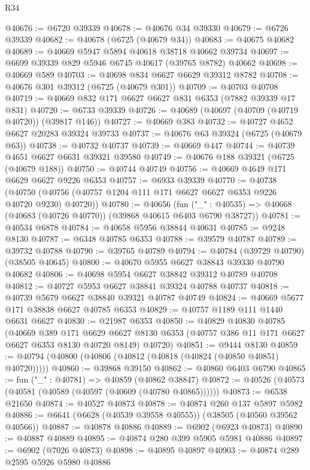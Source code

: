 \begin{lexlean}{R34}
\begin{coremodule}
@40676 := @6720 @39339
@40678 := @40676 @34 @39330
@40679 := @6726 @39339
@40682 := @40678 (@6725 (@40679 @34))
@40683 := @40675 @40682
@40689 := @40669 @5947 @5894 @40618 @38718 @40662 @39734
@40697 := @6699 @39339 @829 @5946 @6745 @40617 (@39765 @8782) @40662
@40698 := @40669 @589
@40703 := @40698 @834 @6627 @6629 @39312 @8782
@40708 := @40676 @301 @39312 (@6725 (@40679 @301))
@40709 := @40703 @40708
@40719 := @40669 @832 @171 @6627 @6627 @831 @6353 (@7882 @39339 @17 @831)
@40720 := @6733 @39339
@40726 := @40689 (@40697 (@40709 (@40719 @40720)) (@39817 @146))
@40727 := @40669 @383
@40732 := @40727 @4652 @6627 @20283 @39324 @39733
@40737 := @40676 @63 @39324 (@6725 (@40679 @63))
@40738 := @40732 @40737
@40739 := @40669 @447
@40744 := @40739 @4651 @6627 @6631 @39321 @39580
@40749 := @40676 @188 @39321 (@6725 (@40679 @188))
@40750 := @40744 @40749
@40756 := @40669 @4649 @171 @6629 @6627 @9226 @6353
@40757 := @6933 @39339
@40770 := @40738
    (@40750 (@40756 (@40757 @1204 @111 @171 @6627 @6627 @6353 @9226 @40720 @9230) @40720))
@40780 := @40656
    (fun ("_" : @40535) => @40668 (@40683 (@40726 @40770)) (@39868 @40615 @6403 @6790 @38727))
@40781 := @40534 @6878
@40784 := @40658 @5956 @38844 @40631
@40785 := @9248 @8130
@40787 := @6348 @40785 @6353
@40788 := @39579 @40787
@40789 := @39732 @40788
@40790 := @39765 @40789
@40794 := @40784 (@39729 @40790) (@38505 @40645)
@40800 := @40670 @5955 @6627 @38843 @39330 @40790 @40682
@40806 := @40698 @5954 @6627 @38842 @39312 @40789 @40708
@40812 := @40727 @5953 @6627 @38841 @39324 @40788 @40737
@40818 := @40739 @5679 @6627 @38840 @39321 @40787 @40749
@40824 := @40669 @5677 @171 @38838 @6627 @40785 @6353
@40829 := @40757 @1189 @111 @1440 @6631 @6627
@40830 := @21987 @6353
@40850 := @40829
    @40830
    @40785
    (@40669
      @389
      @171
      @6629
      @6627
      @8130
      @6353
      (@40757 @386 @11 @171 @6627 @6627 @6353 @8130 @40720 @8149)
      @40720)
@40851 := @9444 @8130
@40859 := @40794 (@40800 (@40806 (@40812 (@40818 (@40824 (@40850 @40851) @40720)))))
@40860 := @39868 @39150
@40862 := @40860 @6403 @6790
@40865 := fun ("_" : @40781) => @40859 (@40862 @38847)
@40872 := @40526 (@40573 (@40581 (@40589 (@40597 (@40609 (@40780 @40865))))))
@40873 := @6538 @21650
@40874 := @40527 @40873
@40878 := @40874 @260 @137 @5897 @5982
@40886 := @6641 (@6628 (@40539 @39558 @40555)) (@38505 (@40560 @39562 @40566))
@40887 := @40878 @40886
@40889 := @6902 (@6923 @40873)
@40890 := @40887 @40889
@40895 := @40874 @280 @399 @5905 @5981 @40886
@40897 := @6902 (@7026 @40873)
@40898 := @40895 @40897
@40903 := @40874 @289 @2595 @5926 @5980 @40886

\end{coremodule}
\end{lexlean}
